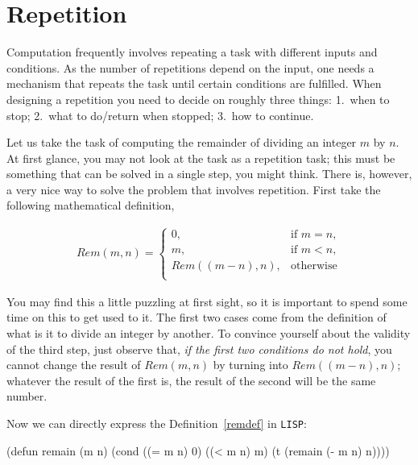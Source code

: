 \documentclass[a4paper,11pt]{article}
\begin{document}
\noindent\hrulefill

\newpage

\section{Repetition}

\begin{uenum}
\item Computation frequently involves repeating a task with different inputs and conditions. As the number of repetitions depend on the input, one needs a mechanism that repeats the task until certain conditions are fulfilled. When designing a repetition you need to decide on roughly three things: 1.\ when to stop; 2.\ what to do/return when stopped; 3.\ how to continue.

Let us take the task of computing the remainder of dividing an integer $m$ by $n$. At first glance, you may not look at the task as a repetition task; this must be something that can be solved in a single step, you might think. There is, however, a very nice way to solve the problem that involves repetition. First take the following mathematical definition, 

\begin{align}\label{remdef}
Rem(m,n) =  
\begin{cases}
0, & \text{if } m = n, \\
m, &  \text{if } m < n, \\
Rem((m-n),n), & \text{otherwise}\\
\end{cases}
\end{align}

You may find this a little puzzling at first sight, so it is important to spend some time on this to get used to it. The first two cases come from the definition of what is it to divide an integer by another. To convince yourself about the validity of the third step, just observe that, \emph{if the first two conditions do not hold}, you cannot change the result of $Rem(m,n)$ by turning into $Rem((m - n),n)$; whatever the result of the first is, the result of the second will be the same number.

Now we can directly express the Definition~\ref{remdef} in \Verb+LISP+:

\begin{lispcode}
(defun remain (m n)
  (cond ((= m n) 0)
        ((< m n) m)
        (t (remain (- m n) n))))
\end{lispcode}


\end{uenum}
\end{document}

